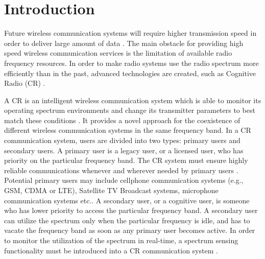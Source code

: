 \chapter{Introduction}
Future wireless communication systems will require higher transmission speed in order to deliver large amount of data \cite{pelcat20133gpp}. The main obstacle for providing high speed wireless communication services is the limitation of available radio frequency resources. In order to make radio systems use the radio spectrum more efficiently than in the past, advanced technologies are created, such as Cognitive Radio (CR) \cite{nonotice}. 

A CR is an intelligent wireless communication system which is able to monitor its operating spectrum environments and change its transmitter parameters to best match these conditions \cite{wang2011advances, a001}. It provides a novel approach for the coexistence of different wireless communication systems in the same frequency band. In a CR communication system, users are divided into two types: primary users and secondary users. A primary user is a legacy user, or a licensed user, who has priority on the particular frequency band. The CR system must ensure highly reliable communications whenever and wherever needed by primary users \cite{a001}. Potential primary users may include cellphone communication systems (e.g., GSM, CDMA or LTE), Satellite TV Broadcast systems, microphone communication systems etc.. A secondary user, or a cognitive user, is someone who has lower priority to access the particular frequency band. A secondary user can utilize the spectrum only when the particular frequency is idle, and has to vacate the frequency band as soon as any primary user becomes active. 
In order to monitor the utilization of the spectrum in real-time, a spectrum sensing functionality must be introduced into a CR communication system \cite{buddhikot2007understanding, tandra2009spectrum}.   

